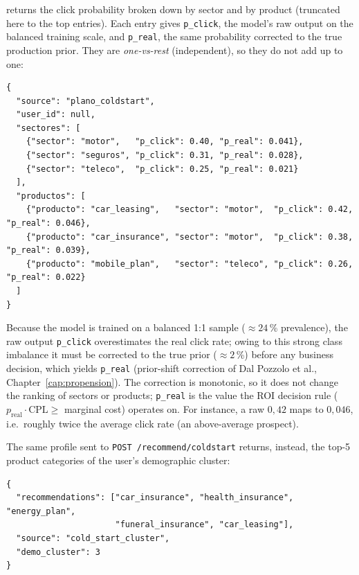 returns the click probability broken down by sector and by product (truncated here to the top entries). Each entry gives \texttt{p\_click}, the model's raw output on the balanced training scale, and \texttt{p\_real}, the same probability corrected to the true production prior. They are \textit{one-vs-rest} (independent), so they do not add up to one:

\begin{lstlisting}[language={},numbers=none,basicstyle=\ttfamily\footnotesize,caption={Response --- \texttt{POST /propensity} (output, abridged)},captionpos=b]
{
  "source": "plano_coldstart",
  "user_id": null,
  "sectores": [
    {"sector": "motor",   "p_click": 0.40, "p_real": 0.041},
    {"sector": "seguros", "p_click": 0.31, "p_real": 0.028},
    {"sector": "teleco",  "p_click": 0.25, "p_real": 0.021}
  ],
  "productos": [
    {"producto": "car_leasing",   "sector": "motor",  "p_click": 0.42, "p_real": 0.046},
    {"producto": "car_insurance", "sector": "motor",  "p_click": 0.38, "p_real": 0.039},
    {"producto": "mobile_plan",   "sector": "teleco", "p_click": 0.26, "p_real": 0.022}
  ]
}
\end{lstlisting}

Because the model is trained on a balanced 1:1 sample ($\approx 24$\,\% prevalence), the raw output \texttt{p\_click} overestimates the real click rate; owing to this strong class imbalance it must be corrected to the true prior ($\approx 2$\,\%) before any business decision, which yields \texttt{p\_real} (prior-shift correction of Dal Pozzolo et al., Chapter~\ref{cap:propension}). The correction is monotonic, so it does not change the ranking of sectors or products; \texttt{p\_real} is the value the ROI decision rule ($p_\text{real}\cdot\text{CPL}\ge$ marginal cost) operates on. For instance, a raw $0{,}42$ maps to $0{,}046$, i.e.\ roughly twice the average click rate (an above-average prospect).

The same profile sent to \texttt{POST /recommend/coldstart} returns, instead, the top-5 product categories of the user's demographic cluster:

\begin{lstlisting}[language={},numbers=none,basicstyle=\ttfamily\footnotesize,caption={Response --- \texttt{POST /recommend/coldstart} (output)},captionpos=b]
{
  "recommendations": ["car_insurance", "health_insurance", "energy_plan",
                      "funeral_insurance", "car_leasing"],
  "source": "cold_start_cluster",
  "demo_cluster": 3
}
\end{lstlisting}

